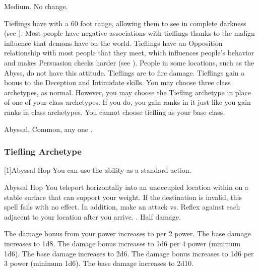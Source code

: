          Medium.
         No change.
        \begin{itemize}
             Tieflings have  with a 60 foot range, allowing them to see in complete darkness (see ).
             Most people have negative associations with tieflings thanks to the malign influence that demons have on the world.
                Tieflings have an Opposition relationship with most people that they meet, which influences people's behavior and makes Persuasion checks harder (see ).
                People in some locations, such as the Abyss, do not have this attitude.
             Tieflings are  to fire damage.
             Tieflings gain a  bonus to the Deception and Intimidate skills.
             You may choose three class archetypes, as normal.
                However, you may choose the Tiefling archetype in place of one of your class archetypes.
                If you do, you gain ranks in it just like you gain ranks in class archetypes.
                You cannot choose tiefling as your base class.
        \end{itemize}
         Abyssal, Common, any one .

        \subsubsection{Tiefling Archetype}
            [1]{Abyssal Hop} You can use the  ability as a standard action.
            \begin{magicalactiveability}{Abyssal Hop}
                \rankline
                You teleport horizontally into an unoccupied location within \shortrange on a stable surface that can support your weight.
                If the destination is invalid, this spell fails with no effect.
                In addition, make an attack vs. Reflex against each  adjacent to your location after you arrive.
                \hit {}.
                \miss Half damage.

                \rankline
                 The damage bonus from your power increases to  per 2 power.
                 The base damage increases to 1d8.
                 The damage bonus increases to 1d6 per 4 power (minimum 1d6).
                 The base damage increases to 2d6.
                 The damage bonus increases to 1d6 per 3 power (minimum 1d6).
                 The base damage increases to 2d10.
            \end{magicalactiveability}

